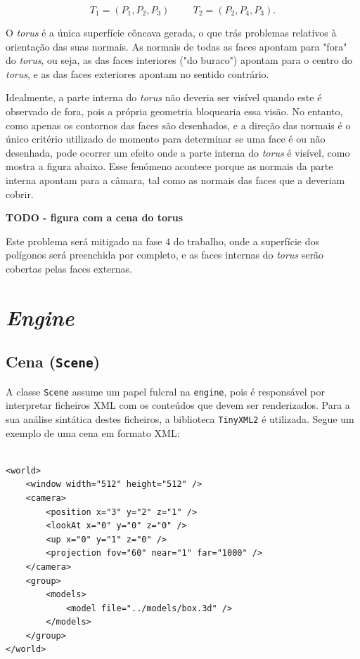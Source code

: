 \documentclass[12pt, a4paper]{article}
\begin{document}
$$
T_1 = (P_1, P_2, P_3)
\hspace{1cm}
T_2 = (P_2, P_4, P_3).
$$

O \emph{torus} é a única superfície côncava gerada, o que trás problemas relativos à orientação das
suas normais. As normais de todas as faces apontam para "fora"{} do \emph{torus}, ou seja, as das
faces interiores ("do buraco"{}) apontam para o centro do \emph{torus}, e as das faces exteriores
apontam no sentido contrário.

Idealmente, a parte interna do \emph{torus} não deveria ser visível quando este é observado de fora,
pois a própria geometria bloquearia essa visão. No entanto, como apenas os contornos das faces são
desenhados, e a direção das normais é o único critério utilizado de momento para determinar se uma
face é ou não desenhada, pode ocorrer um efeito onde a parte interna do \emph{torus} é visível, como
mostra a figura abaixo. Esse fenómeno acontece porque as normais da parte interna apontam para a
câmara, tal como as normais das faces que a deveriam cobrir.

\textbf{\color{red} TODO - figura com a cena do torus}

Este problema será mitigado na fase 4 do trabalho, onde a superfície dos polígonos será preenchida
por completo, e as faces internas do \emph{torus} serão cobertas pelas faces externas.

\section{\emph{Engine}}

\subsection{Cena (\texttt{Scene})}

A classe \texttt{Scene} assume um papel fulcral na \texttt{engine}, pois é responsável por
interpretar ficheiros XML com os conteúdos que devem ser renderizados. Para a sua análise sintática
destes ficheiros, a biblioteca \texttt{TinyXML2} \cite{tinyxml2} é utilizada. Segue um exemplo de
uma cena em formato XML:


\begin{lstlisting}

<world>
    <window width="512" height="512" />
    <camera>
        <position x="3" y="2" z="1" />
        <lookAt x="0" y="0" z="0" />
        <up x="0" y="1" z="0" />
        <projection fov="60" near="1" far="1000" />
    </camera>
    <group>
        <models>
            <model file="../models/box.3d" />
        </models>
    </group>
</world>
\end{lstlisting}
\end{document}

